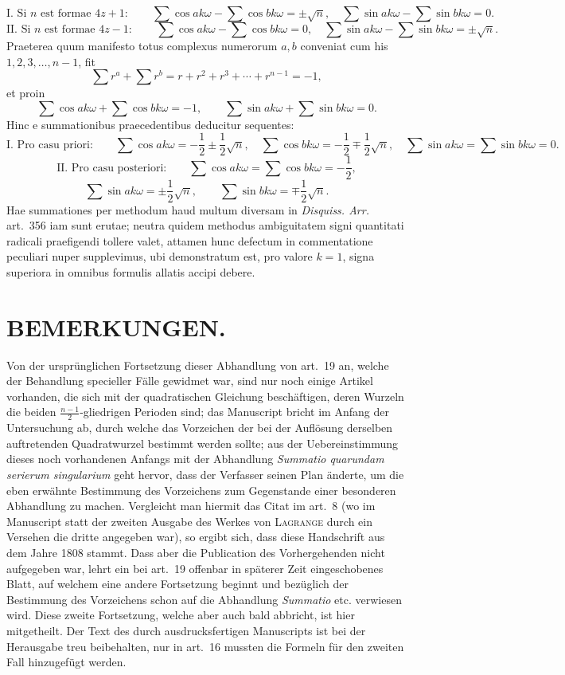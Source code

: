 \documentclass[12pt]{article}
\begin{document}
\[
\text{I. Si }n\text{ est formae }4z+1:
\qquad
\sum\cos ak\omega-\sum\cos bk\omega=\pm\sqrt n,\quad
\sum\sin ak\omega-\sum\sin bk\omega=0.
\]
\[
\text{II. Si }n\text{ est formae }4z-1:
\qquad
\sum\cos ak\omega-\sum\cos bk\omega=0,\quad
\sum\sin ak\omega-\sum\sin bk\omega=\pm\sqrt n.
\]
Praeterea quum manifesto totus complexus numerorum $a,b$ conveniat cum his $1,2,3,\ldots,n-1$, fit
\[
\sum r^a+\sum r^b=r+r^2+r^3+\cdots+r^{n-1}=-1,
\]
et proin
\[
\sum\cos ak\omega+\sum\cos bk\omega=-1,\qquad
\sum\sin ak\omega+\sum\sin bk\omega=0.
\]
Hinc e summationibus praecedentibus deducitur sequentes:
\[
\text{I. Pro casu priori:}\qquad
\sum\cos ak\omega=-\frac12\pm\frac12\sqrt n,\quad
\sum\cos bk\omega=-\frac12\mp\frac12\sqrt n,\quad
\sum\sin ak\omega=\sum\sin bk\omega=0.
\]
\[
\text{II. Pro casu posteriori:}\qquad
\sum\cos ak\omega=\sum\cos bk\omega=-\frac12,
\]
\[
\sum\sin ak\omega=\pm\frac12\sqrt n,\qquad
\sum\sin bk\omega=\mp\frac12\sqrt n.
\]
Hae summationes per methodum haud multum diversam in \emph{Disquiss. Arr.} art.~356 iam sunt erutae; neutra quidem methodus ambiguitatem signi quantitati radicali praefigendi tollere valet, attamen hunc defectum in commentatione peculiari nuper supplevimus, ubi demonstratum est, pro valore $k=1$, signa superiora in omnibus formulis allatis accipi debere.

\section*{BEMERKUNGEN.}

Von der ursprünglichen Fortsetzung dieser Abhandlung von art.~19 an, welche der Behandlung specieller Fälle gewidmet war, sind nur noch einige Artikel vorhanden, die sich mit der quadratischen Gleichung beschäftigen, deren Wurzeln die beiden $\frac{n-1}{2}$-gliedrigen Perioden sind; das Manuscript bricht im Anfang der Untersuchung ab, durch welche das Vorzeichen der bei der Auflösung derselben auftretenden Quadratwurzel bestimmt werden sollte; aus der Uebereinstimmung dieses noch vorhandenen Anfangs mit der Abhandlung \emph{Summatio quarundam serierum singularium} geht hervor, dass der Verfasser seinen Plan änderte, um die eben erwähnte Bestimmung des Vorzeichens zum Gegenstande einer besonderen Abhandlung zu machen. Vergleicht man hiermit das Citat im art.~8 (wo im Manuscript statt der zweiten Ausgabe des Werkes von \textsc{Lagrange} durch ein Versehen die dritte angegeben war), so ergibt sich, dass diese Handschrift aus dem Jahre 1808 stammt. Dass aber die Publication des Vorhergehenden nicht aufgegeben war, lehrt ein bei art.~19 offenbar in späterer Zeit eingeschobenes Blatt, auf welchem eine andere Fortsetzung beginnt und bezüglich der Bestimmung des Vorzeichens schon auf die Abhandlung \emph{Summatio} etc. verwiesen wird. Diese zweite Fortsetzung, welche aber auch bald abbricht, ist hier mitgetheilt. Der Text des durch ausdrucksfertigen Manuscripts ist bei der Herausgabe treu beibehalten, nur in art.~16 mussten die Formeln für den zweiten Fall hinzugefügt werden.
\end{document}
